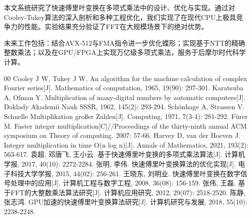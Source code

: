 \documentclass[10pt,journal,compsoc]{IEEEtran}
\begin{document}
本文系统研究了快速傅里叶变换在多项式乘法中的设计、优化与实现。通过对Cooley-Tukey算法的深入剖析和多种工程优化，我们实现了在现代CPU上极具竞争力的性能。实验结果充分验证了FFT在大规模场景下的绝对优势。

未来工作包括：结合AVX-512与FMA指令进一步优化蝶形；实现基于NTT的精确整数乘法；以及在GPU/FPGA上实现万亿级多项式乘法，服务于后摩尔时代科学计算。

\begin{thebibliography}{00}
 Cooley J W, Tukey J W. An algorithm for the machine calculation of complex Fourier series[J]. Mathematics of computation, 1965, 19(90): 297-301.
 Karatsuba A, Ofman Y. Multiplication of many-digital numbers by automatic computers[J]. Doklady Akademii Nauk SSSR, 1962, 145(2): 293-294.
 Schönhage A, Strassen V. Schnelle Multiplikation großer Zahlen[J]. Computing, 1971, 7(3-4): 281-292.
 Fürer M. Faster integer multiplication[C]//Proceedings of the thirty-ninth annual ACM symposium on Theory of computing. 2007: 57-66.
 Harvey D, van der Hoeven J. Integer multiplication in time O(n log n)[J]. Annals of Mathematics, 2021, 193(2): 563-617.
 袁超, 邓唐飞, 王小云. 基于快速傅里叶变换的多项式乘法算法[J]. 计算机学报, 2017, 40(10): 2272-2284. 
 张明, 李伟. 快速傅里叶变换算法的优化实现[J]. 电子科技大学学报, 2015, 44(02): 256-261. 
 王晓东, 刘明业. 快速傅里叶变换在数字信号处理中的应用[J]. 计算机工程与数字工程, 2008, 36(08): 156-159. 
 张伟, 王磊. 基于FFT的大整数乘法算法研究[J]. 计算机应用研究, 2012, 29(07): 2518-2520. 
 陈静, 张志鸿. GPU加速的快速傅里叶变换算法研究[J]. 计算机研究与发展, 2018, 55(10): 2238-2248. 
\end{thebibliography}
\end{document}
